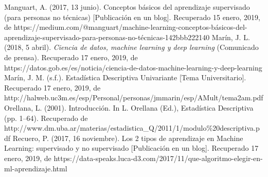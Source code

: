 \documentclass[spanish,12pt, a4paper,twoside]{paper}
\begin{document}
\begin{thebibliography}{00}
Manguart, A. (2017, 13 junio). Conceptos básicos del aprendizaje supervisado (para personas no técnicas) [Publicación en un blog]. Recuperado 15 enero, 2019, de https://medium.com/@manguart/machine-learning-conceptos-básicos-del-aprendizaje-supervisado-para-personas-no-técnicas-142bbb222140
 Marín, J. L. (2018, 5 abril). \emph{Ciencia de datos, machine learning y deep learning} (Comunicado de prensa). Recuperado 17 enero, 2019, de https://datos.gob.es/es/noticia/ciencia-de-datos-machine-learning-y-deep-learning
Marín, J. M. (s.f.). Estadística Descriptiva Univariante [Tema Universitario]. Recuperado 17 enero, 2019, de http://halweb.uc3m.es/esp/Personal/personas/jmmarin/esp/AMult/tema2am.pdf
Orellana, L. (2001). Introducción. In L. Orellana (Ed.), Estadística Descriptiva (pp. 1–64). Recuperado de http://www.dm.uba.ar/materias/estadistica\_Q/2011/1/modulo\%20descriptiva.pdf
Recuero, P. (2017, 16 noviembre). Los 2 tipos de aprendizaje en Machine Learning: supervisado y no supervisado [Publicación en un blog]. Recuperado 17 enero, 2019, de https://data-speaks.luca-d3.com/2017/11/que-algoritmo-elegir-en-ml-aprendizaje.html

\end{thebibliography}
\end{document}
